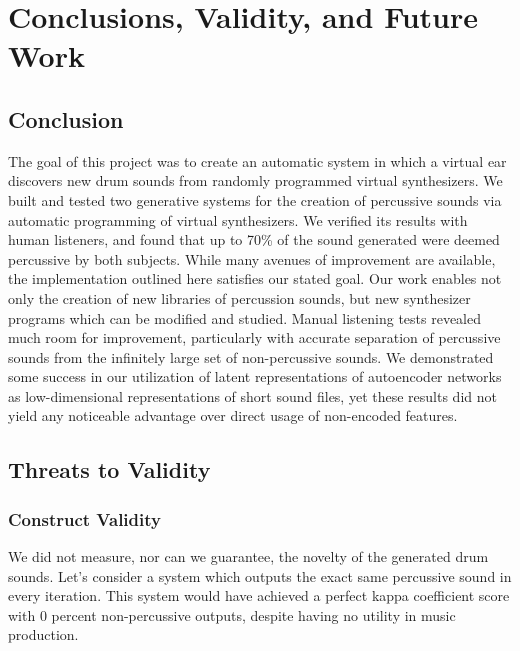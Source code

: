 \documentclass[\main/thesis.tex]{subfiles}
\begin{document}
\chapter{Conclusions, Validity, and Future Work} 

\section{Conclusion}  The goal of this project was to create an automatic system in which a virtual ear discovers new drum sounds from randomly programmed virtual synthesizers. We built and tested two generative systems for the creation of percussive sounds via automatic programming of virtual synthesizers. We verified its results with human listeners, and found that up to 70\% of the sound generated were deemed percussive by both subjects. While many avenues of improvement are available, the implementation outlined here satisfies our stated goal. 
Our work enables not only the creation of new libraries of percussion sounds, but new synthesizer programs which can be modified and studied. 
Manual listening tests revealed much room for improvement, particularly with accurate separation of percussive sounds from the infinitely large set of non-percussive sounds. We demonstrated some success in our utilization of latent representations of autoencoder networks as low-dimensional representations of short sound files, yet these results did not yield any noticeable advantage over direct usage of non-encoded features.
\section{Threats to Validity}
 
\subsection{Construct Validity}
  We did not measure, nor can we guarantee, the novelty of the generated drum sounds. Let's consider a system which outputs the exact same percussive sound in every iteration. This system would have achieved a perfect kappa coefficient score with 0 percent non-percussive outputs, despite having no utility in music production. 
  
\end{document}
